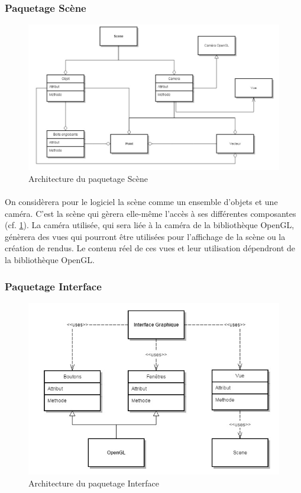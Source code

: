 \newpage

\subsubsection{Paquetage Scène}

\begin{figure}[h]
		\centering
		\includegraphics[scale=0.4]{package_scene.jpg}
		\caption{\label{fig:paqScene} Architecture du paquetage Scène}
\end{figure}

\paragraph{}
On considèrera pour le logiciel la scène comme un ensemble d’objets et une caméra. C’est la scène qui gèrera elle-même l’accès à ses différentes composantes (cf. \ref{fig:paqScene}). La caméra utilisée, qui sera liée à la caméra de la bibliothèque OpenGL, génèrera des vues qui pourront être utilisées pour l’affichage de la scène ou la création de rendus. Le contenu réel de ces vues et leur utilisation dépendront de la bibliothèque OpenGL.

\subsubsection{Paquetage Interface}

\begin{figure}[h]
		\centering
		\includegraphics[scale=0.4]{package_interface.jpg}
		\caption{\label{fig:paqInterface} Architecture du paquetage Interface}
\end{figure}


